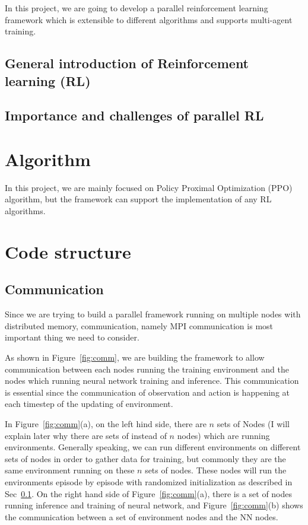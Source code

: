 \documentclass[12Pt]{article}
\begin{document}
In this project, we are going to develop a parallel reinforcement learning framework which is extensible to different algorithms and supports multi-agent training.
\subsection{General introduction of Reinforcement learning (RL)}\label{sec:rl}

\subsection{Importance and challenges of parallel RL}\label{sec:imch}

\section{Algorithm}\label{sec:alg}
In this project, we are mainly focused on Policy Proximal Optimization (PPO) algorithm, but the framework can support the implementation of any RL algorithms. 




\section{Code structure}\label{sec:code}
\subsection{Communication}\label{sec:comm}
Since we are trying to build a parallel framework running on multiple nodes with distributed memory, communication, namely MPI communication is most important thing we need to consider. 

As shown in Figure~\ref{fig:comm}, we are building the framework to allow communication between each nodes running the training environment and the nodes which running neural network training and inference. This communication is essential since the communication of observation and action is happening at each timestep of the updating of environment.  

In Figure~\ref{fig:comm}(a), on the left hind side, there are $n$ sets of Nodes (I will explain later why there are  sets of instead of $n$ nodes) which are running environments. Generally speaking, we can run different environments on different sets of nodes in order to gather data for training, but commonly they are the same environment running on these $n$ sets of nodes. These nodes will run the environments episode by episode with randomized initialization as described in Sec~\ref{sec:rl}. On the right hand side of Figure~\ref{fig:comm}(a), there is a set of nodes running inference and training of neural network, and Figure~\ref{fig:comm}(b) shows the communication between a set of environment nodes and the NN nodes. 
\end{document}

